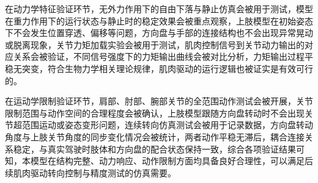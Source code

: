在动力学特征验证环节，无外力作用下的自由下落与静止仿真会被用于测试，模型在重力作用下的运行状态与静止时的稳定效果会被重点观察，上肢模型在初始姿态下不会发生位置穿透、偏移等问题，方向盘与手部的连接结构也不会出现异常晃动或脱离现象，关节力矩加载实验会被用于测试，肌肉控制信号到关节动力输出的对应关系会被验证，不同信号强度下的力矩输出曲线会被对比分析，力矩输出过程平稳无突变，符合生物力学相关理论规律，肌肉驱动的运行逻辑也被证实是有效可行的。

在运动学限制验证环节，肩部、肘部、腕部关节的全范围动作测试会被开展，关节限制范围与动作空间的合理程度会被确认，上肢模型跟随方向盘转动时不会出现关节超范围运动或姿态变形问题，连续转向仿真测试会被用于记录数据，方向盘转动角度与上肢关节角度的同步变化情况会被统计，两者动作平稳无滞后，耦合连接关系稳定，与真实驾驶时肢体和方向盘的配合状态保持一致，综合各项验证结果可知，本模型在结构完整、动力响应、动作限制方面均具备良好合理性，可以满足后续肌肉驱动转向控制与精度测试的仿真需要。

